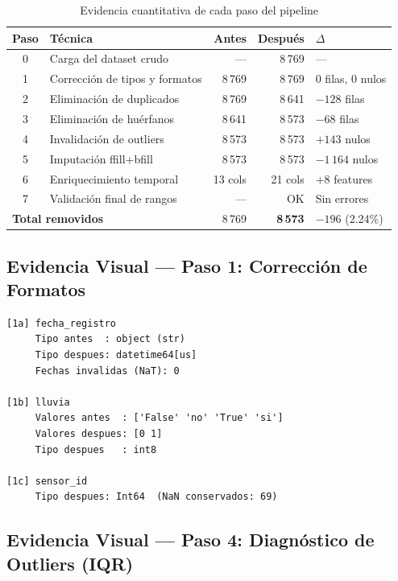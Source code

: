 \begin{table}[h!]
  \centering
  \caption{Evidencia cuantitativa de cada paso del pipeline}
  \begin{tabularx}{\textwidth}{clrrX}
    \toprule
    \textbf{Paso} & \textbf{T\'ecnica} & \textbf{Antes} & \textbf{Despu\'es} & $\Delta$ \\
    \midrule
    0 & Carga del dataset crudo              & ---   & 8\,769 & --- \\
    1 & Correcci\'on de tipos y formatos      & 8\,769 & 8\,769 & 0 filas, 0 nulos \\
    2 & Eliminaci\'on de duplicados           & 8\,769 & 8\,641 & $-128$ filas \\
    3 & Eliminaci\'on de hu\'erfanos          & 8\,641 & 8\,573 & $-68$ filas \\
    4 & Invalidaci\'on de outliers            & 8\,573 & 8\,573 & $+143$ nulos \\
    5 & Imputaci\'on ffill+bfill              & 8\,573 & 8\,573 & $-1\,164$ nulos \\
    6 & Enriquecimiento temporal              & 13 cols & 21 cols & $+8$ features \\
    7 & Validaci\'on final de rangos          & ---   & OK    & Sin errores \\
    \midrule
    \multicolumn{2}{l}{\textbf{Total removidos}} & 8\,769 & \textbf{8\,573} & $-196$ (2.24\%) \\
    \bottomrule
  \end{tabularx}
\end{table}

\subsection{Evidencia Visual --- Paso 1: Correcci\'on de Formatos}

\begin{lstlisting}[caption=Salida real del PASO 1 -- correcci\'on de tipos]
[1a] fecha_registro
     Tipo antes  : object (str)
     Tipo despues: datetime64[us]
     Fechas invalidas (NaT): 0

[1b] lluvia
     Valores antes  : ['False' 'no' 'True' 'si']
     Valores despues: [0 1]
     Tipo despues   : int8

[1c] sensor_id
     Tipo despues: Int64  (NaN conservados: 69)
\end{lstlisting}

\subsection{Evidencia Visual --- Paso 4: Diagn\'ostico de Outliers (IQR)}


